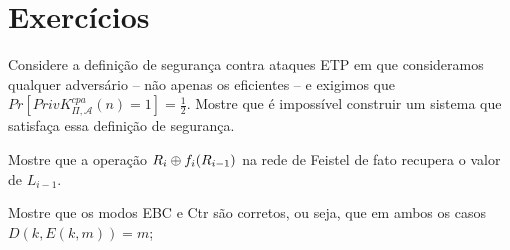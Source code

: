 


\section{Exercícios}
\label{sec:exercicios}

\begin{exercicio}
  Considere a definição de segurança contra ataques ETP em que consideramos qualquer adversário -- não apenas os eficientes -- e exigimos que $Pr[PrivK^{cpa}_{\Pi,\mathcal{A}}(n) = 1] = \frac{1}{2}$.
  Mostre que é impossível construir um sistema que satisfaça essa definição de segurança.
\end{exercicio}

\begin{exercicio}
Mostre que a operação $R_i \oplus f_i(R_{i-1})$ na rede de Feistel de fato recupera o valor de $L_{i-1}$.
\end{exercicio}

\begin{exercicio}
  Mostre que os modos EBC e Ctr são corretos, ou seja, que em ambos os casos $D(k, E(k,m)) = m$;
\end{exercicio}


